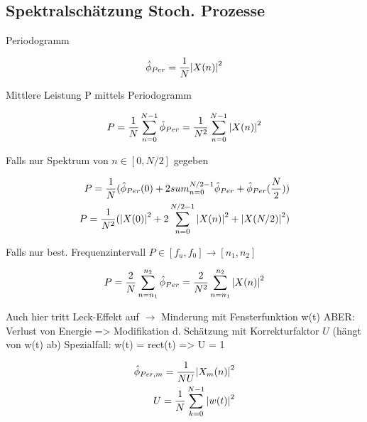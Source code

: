 \documentclass[10pt,a4paper]{article}
\begin{document}
\subsection{Spektralschätzung Stoch. Prozesse}
Periodogramm
  \begin{mdframed}[style=exercise]
    \begin{align}
        \hat{\phi}_{Per} = \frac{1}{N}\abs{X(n)}^2
    \end{align}
  \end{mdframed}
Mittlere Leistung P mittels Periodogramm
  \begin{mdframed}[style=exercise]
    \begin{align}
        P = \frac{1}{N}\sum_{n=0}^{N-1} \hat{\phi}_{Per} = \frac{1}{N^2}\sum_{n=0}^{N-1} \abs{X(n)}^2
    \end{align}
  \end{mdframed}
Falls nur Spektrum von $n\in [0,N/2]$ gegeben
  \begin{mdframed}[style=exercise]
    \begin{align}
        P = \frac{1}{N}( \hat{\phi}_{Per}(0) + 2 sum_{n=0}^{N/2-1} \hat{\phi}_{Per} + \hat{\phi}_{Per}(\frac{N}{2})) \\
        P = \frac{1}{N^2}( \abs{X(0)}^2 + 2 \sum_{n=0}^{N/2-1} \abs{X(n)}^2 + \abs{X(N/2)}^2) 
    \end{align}
  \end{mdframed}
Falls nur best. Frequenzintervall $P\in [f_u,f_0] \rightarrow [n_1,n_2]$ 
  \begin{mdframed}[style=exercise]
    \begin{align}
        P = \frac{2}{N}\sum_{n=n_1}^{n_2} \hat{\phi}_{Per} = \frac{2}{N^2}\sum_{n=n_1}^{n_2} \abs{X(n)}^2
    \end{align}
  \end{mdframed}
Auch hier tritt Leck-Effekt auf $\rightarrow$ Minderung mit Fensterfunktion w(t) 
ABER: Verlust von Energie => Modifikation d. Schätzung mit Korrekturfaktor $U$ (hängt von w(t) ab)
Spezialfall: w(t) = rect(t) => U = 1 
  \begin{mdframed}[style=exercise]
    \begin{align}
        \hat{\phi}_{Per,m} = \frac{1}{NU}\abs{X_m(n)}^2\\
        U = \frac{1}{N}\sum_{k=0}^{N-1} \abs{w(t)}^2 
    \end{align}
  \end{mdframed}
\end{document}
